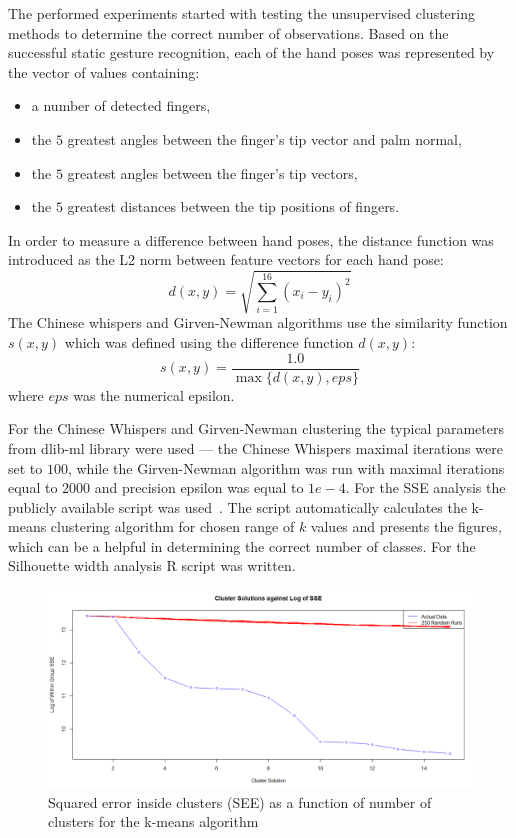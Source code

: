 The performed experiments started with testing the unsupervised clustering methods to determine the correct number of observations.
Based on the successful static gesture recognition, each of the hand poses was represented by the vector of values containing:
\begin{itemize}
\item a number of detected fingers,
\item the $5$ greatest angles between the finger's tip vector and palm normal,
\item the $5$ greatest angles between the finger's tip vectors,
\item the $5$ greatest distances between the tip positions of fingers.
\end{itemize}
In order to measure a difference between hand poses, the distance function was introduced as the L2 norm between feature vectors for each hand pose:
\begin{equation}
d(x,y) = \sqrt{ \sum_{i=1}^{16} (x_i - y_i)^2 }
\end{equation}
The Chinese whispers and Girven-Newman algorithms use the similarity function $s(x,y)$ which was defined using the difference function $d(x,y)$: 
\begin{equation}
s(x,y) = \frac{1.0}{ \max{\{d(x,y), eps\}}}
\end{equation}
where $eps$ was the numerical epsilon.

For the Chinese Whispers and Girven-Newman clustering the typical parameters from dlib-ml library were used --- the Chinese Whispers maximal iterations were set to $100$, while the Girven-Newman algorithm was run with maximal iterations equal to $2000$ and precision epsilon was equal to $1e-4$.
For the SSE analysis the publicly available script was used~\cite{SSE}. 
The script automatically calculates the k-means clustering algorithm for chosen range of $k$ values and presents the figures, which can be a helpful in determining the correct number of classes.
For the Silhouette width analysis R script was written.

\begin{figure}[htbp!]
\centering
 \includegraphics[width=1.0\columnwidth]{figures/SSE1.png}
 \caption{Squared error inside clusters (SEE) as a function of number of clusters for the k-means algorithm}
 \label{dynamicSSE}
\end{figure}

